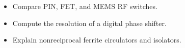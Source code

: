 \begin{objectives}
\begin{itemize}[leftmargin=1.4em,itemsep=2pt]
\item Compare PIN, FET, and MEMS RF switches.
\item Compute the resolution of a digital phase shifter.
\item Explain nonreciprocal ferrite circulators and isolators.
\end{itemize}
\end{objectives}
